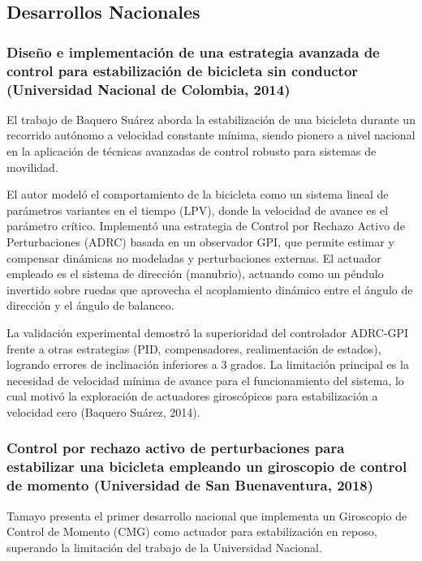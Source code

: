 \documentclass[12pt,letterpaper]{report}
\begin{document}
\subsection{Desarrollos Nacionales}

\subsubsection{Diseño e implementación de una estrategia avanzada de control para estabilización de bicicleta sin conductor (Universidad Nacional de Colombia, 2014)}

El trabajo de Baquero Suárez aborda la estabilización de una bicicleta durante un recorrido autónomo a velocidad constante mínima, siendo pionero a nivel nacional en la aplicación de técnicas avanzadas de control robusto para sistemas de movilidad.

El autor modeló el comportamiento de la bicicleta como un sistema lineal de parámetros variantes en el tiempo (LPV), donde la velocidad de avance es el parámetro crítico. Implementó una estrategia de Control por Rechazo Activo de Perturbaciones (ADRC) basada en un observador GPI, que permite estimar y compensar dinámicas no modeladas y perturbaciones externas. El actuador empleado es el sistema de dirección (manubrio), actuando como un péndulo invertido sobre ruedas que aprovecha el acoplamiento dinámico entre el ángulo de dirección y el ángulo de balanceo.

La validación experimental demostró la superioridad del controlador ADRC-GPI frente a otras estrategias (PID, compensadores, realimentación de estados), logrando errores de inclinación inferiores a 3 grados. La limitación principal es la necesidad de velocidad mínima de avance para el funcionamiento del sistema, lo cual motivó la exploración de actuadores giroscópicos para estabilización a velocidad cero (Baquero Suárez, 2014).

\subsubsection{Control por rechazo activo de perturbaciones para estabilizar una bicicleta empleando un giroscopio de control de momento (Universidad de San Buenaventura, 2018)}

Tamayo presenta el primer desarrollo nacional que implementa un Giroscopio de Control de Momento (CMG) como actuador para estabilización en reposo, superando la limitación del trabajo de la Universidad Nacional.
\end{document}
